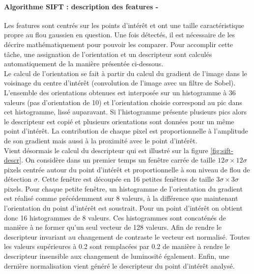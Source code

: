 \documentclass[a4paper, 11pt]{article}
\begin{document}
		\paragraph{Algorithme SIFT : description des features -}
		Les features sont centrés sur les points d'intérêt et ont une taille caractéristique propre au flou gaussien en question. Une fois détectés, il est nécessaire de les décrire mathématiquement pour pouvoir les comparer. Pour accomplir cette tâche, une assignation de l'orientation et un descripteur sont calculés automatiquement de la manière présentée ci-dessous.
		\\Le calcul de l'orientation se fait à partir du calcul du gradient de l'image dans le voisinage du centre d'intérêt (convolution de l'image avec un filtre de Sobel). L'ensemble des orientations obtenues est interposée sur un histogramme à 36 valeurs (pas d'orientation de \SI{10}{\degres}) et l'orientation choisie correspond au pic dans cet histogramme, lissé auparavant. Si l'histogramme présente plusieurs pics alors le descripteur est copié et plusieurs orientations sont données pour un même point d'intérêt. La contribution de chaque pixel est proportionnelle à l'amplitude de son gradient mais aussi à la proximité avec le point d'intérêt.
		\\Vient désormais le calcul du descripteur qui est illustré sur la figure \ref{fig:sift-descr}. On considère dans un premier temps un fenêtre carrée de taille $12\sigma \times 12\sigma$ pixels centrée autour du point d'intérêt et proportionnelle à son niveau de flou de détection $\sigma$. Cette fenêtre est découpée en 16 petites fenêtres de taille $3\sigma \times 3\sigma$ pixels. Pour chaque petite fenêtre, un histogramme de l'orientation du gradient est réalisé comme précédemment sur 8 valeurs, à la différence que maintenant l'orientation du point d'intérêt est soustrait. Pour un point d'intérêt on obtient donc 16 histogrammes de 8 valeurs. Ces histogrammes sont concaténés de manière à ne former qu'un seul vecteur de 128 valeurs. Afin de rendre le descripteur invariant au changement de contraste le vecteur est normalisé. Toutes les valeurs supérieures à \num{0.2} sont remplacées par \num{0.2} de manière à rendre le descripteur insensible aux changement de luminosité également. Enfin, une dernière normalisation vient généré le descripteur du point d'intérêt analysé.
\end{document}

